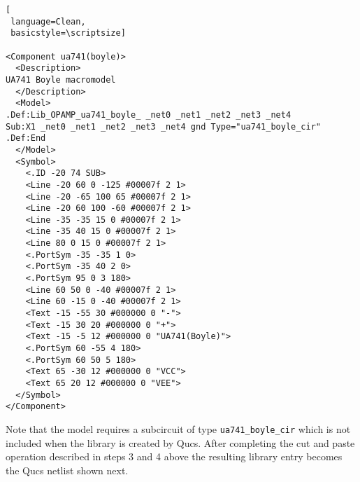 \begin{lstlisting}[
 language=Clean, 
 basicstyle=\scriptsize]

<Component ua741(boyle)>
  <Description>
UA741 Boyle macromodel
  </Description>
  <Model>
.Def:Lib_OPAMP_ua741_boyle_ _net0 _net1 _net2 _net3 _net4
Sub:X1 _net0 _net1 _net2 _net3 _net4 gnd Type="ua741_boyle_cir"
.Def:End
  </Model>
  <Symbol>
    <.ID -20 74 SUB>
    <Line -20 60 0 -125 #00007f 2 1>
    <Line -20 -65 100 65 #00007f 2 1>
    <Line -20 60 100 -60 #00007f 2 1>
    <Line -35 -35 15 0 #00007f 2 1>
    <Line -35 40 15 0 #00007f 2 1>
    <Line 80 0 15 0 #00007f 2 1>
    <.PortSym -35 -35 1 0>
    <.PortSym -35 40 2 0>
    <.PortSym 95 0 3 180>
    <Line 60 50 0 -40 #00007f 2 1>
    <Line 60 -15 0 -40 #00007f 2 1>
    <Text -15 -55 30 #000000 0 "-">
    <Text -15 30 20 #000000 0 "+">
    <Text -15 -5 12 #000000 0 "UA741(Boyle)">
    <.PortSym 60 -55 4 180>
    <.PortSym 60 50 5 180>
    <Text 65 -30 12 #000000 0 "VCC">
    <Text 65 20 12 #000000 0 "VEE">
  </Symbol>
</Component>
\end{lstlisting}

Note that the model requires a subcircuit of type \verb|ua741_boyle_cir| which is not included when the library is created by Qucs.  After completing the cut and paste operation described in steps 3 and 4 above the resulting library entry becomes the Qucs netlist shown next.

